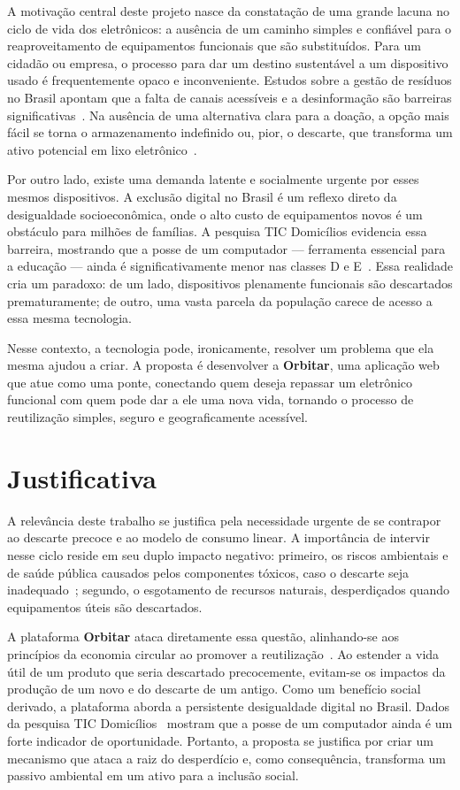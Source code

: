 \documentclass[
	12pt,				%
	openright,			%
	oneside,			%
	a4paper,			%
	english,			%
	brazil				%
	]{abntex2}
\theoremstyle{definition}
\begin{document}
A motivação central deste projeto nasce da constatação de uma grande lacuna no ciclo de vida dos eletrônicos: a ausência de um caminho simples e confiável para o reaproveitamento de equipamentos funcionais que são substituídos. Para um cidadão ou empresa, o processo para dar um destino sustentável a um dispositivo usado é frequentemente opaco e inconveniente. Estudos sobre a gestão de resíduos no Brasil apontam que a falta de canais acessíveis e a desinformação são barreiras significativas~\cite{GreenEletron2022}. Na ausência de uma alternativa clara para a doação, a opção mais fácil se torna o armazenamento indefinido ou, pior, o descarte, que transforma um ativo potencial em lixo eletrônico~\cite{forti2024}.

Por outro lado, existe uma demanda latente e socialmente urgente por esses mesmos dispositivos. A exclusão digital no Brasil é um reflexo direto da desigualdade socioeconômica, onde o alto custo de equipamentos novos é um obstáculo para milhões de famílias. A pesquisa TIC Domicílios evidencia essa barreira, mostrando que a posse de um computador — ferramenta essencial para a educação — ainda é significativamente menor nas classes D e E~\cite{cgi2024}. Essa realidade cria um paradoxo: de um lado, dispositivos plenamente funcionais são descartados prematuramente; de outro, uma vasta parcela da população carece de acesso a essa mesma tecnologia.

Nesse contexto, a tecnologia pode, ironicamente, resolver um problema que ela mesma ajudou a criar. A proposta é desenvolver a \textbf{Orbitar}, uma aplicação web que atue como uma ponte, conectando quem deseja repassar um eletrônico funcional com quem pode dar a ele uma nova vida, tornando o processo de reutilização simples, seguro e geograficamente acessível.

\section[Justificativa]{Justificativa}

A relevância deste trabalho se justifica pela necessidade urgente de se contrapor ao descarte precoce e ao modelo de consumo linear. A importância de intervir nesse ciclo reside em seu duplo impacto negativo: primeiro, os riscos ambientais e de saúde pública causados pelos componentes tóxicos, caso o descarte seja inadequado~\cite{perkins2014}; segundo, o esgotamento de recursos naturais, desperdiçados quando equipamentos úteis são descartados.

A plataforma \textbf{Orbitar} ataca diretamente essa questão, alinhando-se aos princípios da economia circular ao promover a reutilização~\cite{ellen2023}. Ao estender a vida útil de um produto que seria descartado precocemente, evitam-se os impactos da produção de um novo e do descarte de um antigo. Como um benefício social derivado, a plataforma aborda a persistente desigualdade digital no Brasil. Dados da pesquisa TIC Domicílios~\cite{cgi2024} mostram que a posse de um computador ainda é um forte indicador de oportunidade. Portanto, a proposta se justifica por criar um mecanismo que ataca a raiz do desperdício e, como consequência, transforma um passivo ambiental em um ativo para a inclusão social.
\end{document}
